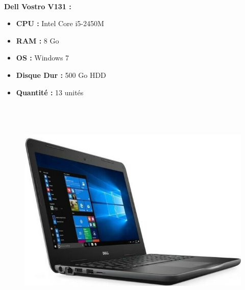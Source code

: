 \documentclass[11pt,a4paper,twoside]{article}
\begin{document}
\paragraph{}\textbf{Dell Vostro V131 :} \\
\begin{itemize}
\item \textbf{CPU :} Intel Core i5-2450M
\item \textbf{RAM :} 8 Go
\item \textbf{OS :} Windows 7
\item \textbf{Disque Dur :} 500 Go HDD
\item \textbf{Quantité :} 13 unités
\\ \\ \\ \\
\end{itemize}
\begin{figure}
\includegraphics[scale=0.4]{Ressources/Materiel/L3380.jpg}\vspace{-2cm}
\end{figure}
\end{document}
